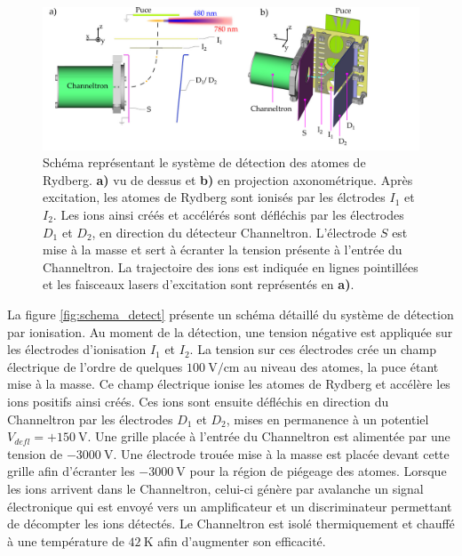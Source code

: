 %
\begin{figure}[h]
\centering
\includegraphics[width=\linewidth]{figures/setup/rydberg/schema_detect}
\caption[Système de détection des atomes de Rydberg]{Schéma représentant le système de détection des atomes de Rydberg.
\textbf{a)} vu de dessus et \textbf{b)} en projection axonométrique.
Après excitation, les atomes de Rydberg sont ionisés par les élctrodes $I_1$ et $I_2$.
Les ions ainsi créés et accélérés sont défléchis par les électrodes $D_1$ et $D_2$, en direction du détecteur Channeltron.
L'électrode $S$ est mise à la masse et sert à écranter la tension présente à l'entrée du Channeltron.
La trajectoire des ions est indiquée en lignes pointillées et les faisceaux lasers d'excitation sont représentés en \textbf{a)}.
}
\label{fig:schema_detect}
\end{figure}
%
La figure \eqref{fig:schema_detect} présente un schéma détaillé du système de détection par ionisation.
Au moment de la détection, une tension négative est appliquée sur les électrodes d'ionisation $I_1$ et $I_2$.
La tension sur ces électrodes crée un champ électrique de l'ordre de quelques $\SI{100}{\V/\cm}$ au niveau des atomes, la puce étant mise à la masse.
Ce champ électrique ionise les atomes de Rydberg et accélère les ions positifs ainsi créés.
Ces ions sont ensuite défléchis en direction du Channeltron par les électrodes $D_1$ et $D_2$, mises en permanence à un potentiel $V_{defl} = +\SI{150}{\V}$.
Une grille placée à l'entrée du Channeltron est alimentée par une tension de $\SI{-3000}{\V}$.
Une électrode trouée mise à la masse est placée devant cette grille afin d'écranter les $\SI{-3000}{\V}$ pour la région de piégeage des atomes.
Lorsque les ions arrivent dans le Channeltron, celui-ci génère par avalanche un signal électronique qui est envoyé vers un amplificateur et un discriminateur permettant de décompter les ions détectés.
Le Channeltron est isolé thermiquement et chauffé à une température de $\SI{42}{\K}$ afin d'augmenter son efficacité.

